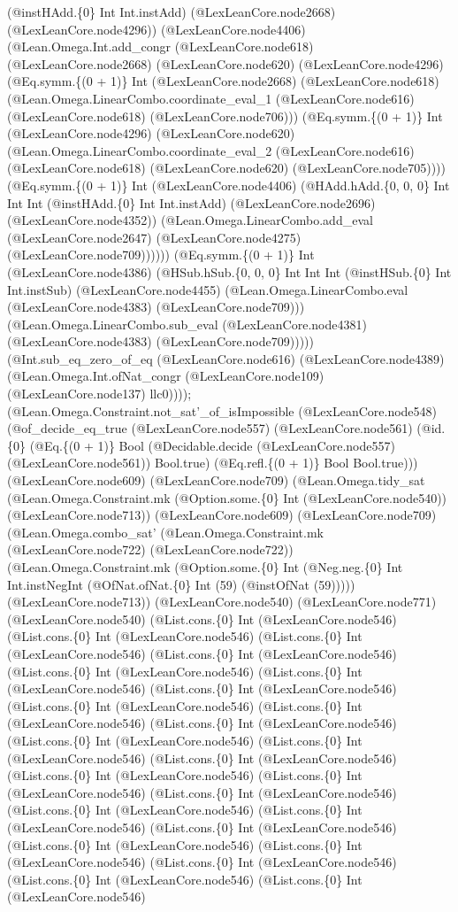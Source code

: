 \documentclass[11pt]{article}
\begin{document}
(@instHAdd.\{0\} Int Int.instAdd) (@LexLeanCore.node2668) (@LexLeanCore.node4296)) (@LexLeanCore.node4406) (@Lean.Omega.Int.add\_congr (@LexLeanCore.node618) (@LexLeanCore.node2668) (@LexLeanCore.node620) (@LexLeanCore.node4296) (@Eq.symm.\{(0 + 1)\} Int (@LexLeanCore.node2668) (@LexLeanCore.node618) (@Lean.Omega.LinearCombo.coordinate\_eval\_1 (@LexLeanCore.node616) (@LexLeanCore.node618) (@LexLeanCore.node706))) (@Eq.symm.\{(0 + 1)\} Int (@LexLeanCore.node4296) (@LexLeanCore.node620) (@Lean.Omega.LinearCombo.coordinate\_eval\_2 (@LexLeanCore.node616) (@LexLeanCore.node618) (@LexLeanCore.node620) (@LexLeanCore.node705)))) (@Eq.symm.\{(0 + 1)\} Int (@LexLeanCore.node4406) (@HAdd.hAdd.\{0, 0, 0\} Int Int Int (@instHAdd.\{0\} Int Int.instAdd) (@LexLeanCore.node2696) (@LexLeanCore.node4352)) (@Lean.Omega.LinearCombo.add\_eval (@LexLeanCore.node2647) (@LexLeanCore.node4275) (@LexLeanCore.node709)))))) (@Eq.symm.\{(0 + 1)\} Int (@LexLeanCore.node4386) (@HSub.hSub.\{0, 0, 0\} Int Int Int (@instHSub.\{0\} Int Int.instSub) (@LexLeanCore.node4455) (@Lean.Omega.LinearCombo.eval (@LexLeanCore.node4383) (@LexLeanCore.node709))) (@Lean.Omega.LinearCombo.sub\_eval (@LexLeanCore.node4381) (@LexLeanCore.node4383) (@LexLeanCore.node709))))) (@Int.sub\_eq\_zero\_of\_eq (@LexLeanCore.node616) (@LexLeanCore.node4389) (@Lean.Omega.Int.ofNat\_congr (@LexLeanCore.node109) (@LexLeanCore.node137) llc0)))); (@Lean.Omega.Constraint.not\_sat'\_of\_isImpossible (@LexLeanCore.node548) (@of\_decide\_eq\_true (@LexLeanCore.node557) (@LexLeanCore.node561) (@id.\{0\} (@Eq.\{(0 + 1)\} Bool (@Decidable.decide (@LexLeanCore.node557) (@LexLeanCore.node561)) Bool.true) (@Eq.refl.\{(0 + 1)\} Bool Bool.true))) (@LexLeanCore.node609) (@LexLeanCore.node709) (@Lean.Omega.tidy\_sat (@Lean.Omega.Constraint.mk (@Option.some.\{0\} Int (@LexLeanCore.node540)) (@LexLeanCore.node713)) (@LexLeanCore.node609) (@LexLeanCore.node709) (@Lean.Omega.combo\_sat' (@Lean.Omega.Constraint.mk (@LexLeanCore.node722) (@LexLeanCore.node722)) (@Lean.Omega.Constraint.mk (@Option.some.\{0\} Int (@Neg.neg.\{0\} Int Int.instNegInt (@OfNat.ofNat.\{0\} Int (59) (@instOfNat (59))))) (@LexLeanCore.node713)) (@LexLeanCore.node540) (@LexLeanCore.node771) (@LexLeanCore.node540) (@List.cons.\{0\} Int (@LexLeanCore.node546) (@List.cons.\{0\} Int (@LexLeanCore.node546) (@List.cons.\{0\} Int (@LexLeanCore.node546) (@List.cons.\{0\} Int (@LexLeanCore.node546) (@List.cons.\{0\} Int (@LexLeanCore.node546) (@List.cons.\{0\} Int (@LexLeanCore.node546) (@List.cons.\{0\} Int (@LexLeanCore.node546) (@List.cons.\{0\} Int (@LexLeanCore.node546) (@List.cons.\{0\} Int (@LexLeanCore.node546) (@List.cons.\{0\} Int (@LexLeanCore.node546) (@List.cons.\{0\} Int (@LexLeanCore.node546) (@List.cons.\{0\} Int (@LexLeanCore.node546) (@List.cons.\{0\} Int (@LexLeanCore.node546) (@List.cons.\{0\} Int (@LexLeanCore.node546) (@List.cons.\{0\} Int (@LexLeanCore.node546) (@List.cons.\{0\} Int (@LexLeanCore.node546) (@List.cons.\{0\} Int (@LexLeanCore.node546) (@List.cons.\{0\} Int (@LexLeanCore.node546) (@List.cons.\{0\} Int (@LexLeanCore.node546) (@List.cons.\{0\} Int (@LexLeanCore.node546) (@List.cons.\{0\} Int (@LexLeanCore.node546) (@List.cons.\{0\} Int (@LexLeanCore.node546) (@List.cons.\{0\} Int (@LexLeanCore.node546) (@List.cons.\{0\} Int (@LexLeanCore.node546) 
\end{document}

